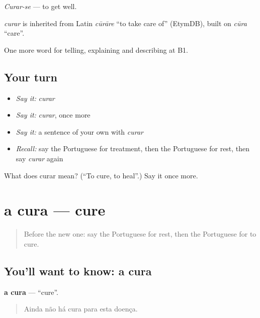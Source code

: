 \emph{Curar-se} — to get well.

\begin{cousinweb}
\emph{curar} is inherited from Latin \emph{cūrāre} \textquotedblleft{}to take care of\textquotedblright{} (EtymDB), built on \emph{cūra} \textquotedblleft{}care\textquotedblright{}.
\end{cousinweb}

\begin{grammarlens}[title={What you've built}]
One more word for telling, explaining and describing at B1.
\end{grammarlens}

\subsection*{Your turn}
\begin{itemize}
\raggedright
  \item \emph{Say it:} \emph{curar}
  \item \emph{Say it:} \emph{curar}, once more
  \item \emph{Say it:} a sentence of your own with \emph{curar}
  \item \emph{Recall:} say the Portuguese for treatment, then the Portuguese for rest, then say \emph{curar} again
\end{itemize}

\begin{tcolorbox}[breakable,colback=teal!4,colframe=teal!35!black,title={Before you move on}]
What does curar mean? (\textquotedblleft{}To cure, to heal\textquotedblright{}.) Say it once more.
\end{tcolorbox}
\section[a cura]{a cura — cure}

\label{lesson:PT-C488-cura}



\begin{quote}
Before the new one: say the Portuguese for rest, then the Portuguese for to cure.
\end{quote}

\subsection*{You'll want to know: a cura}
\textbf{a cura} — \textquotedblleft{}cure\textquotedblright{}.

\begin{quote}
Ainda não há cura para esta doença.
\end{quote}

